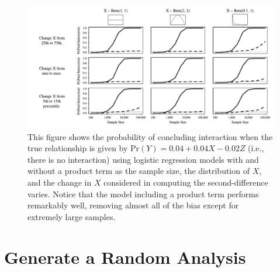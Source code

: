 \documentclass[12pt]{article}
\begin{document}
\begin{appendix}
\begin{figure}[H]
\begin{center}
\includegraphics[scale = .8]{fig/fixed_few1s_update.pdf}
\end{center}\caption{This figure shows the probability of concluding interaction when the true relationship is given by $\text{Pr}(Y) = 0.04 + 0.04X - 0.02Z$ (i.e., there is no interaction) using logistic regression models with and without a product term as the sample size, the distribution of $X$, and the change in $X$ considered in computing the second-difference varies. Notice that the model including a product term performs remarkably well, removing almost all of the bias except for extremely large samples. }\label{fig:sm_few1s}
\end{figure}

\section*{Generate a Random Analysis}


\end{appendix}
\end{document}
